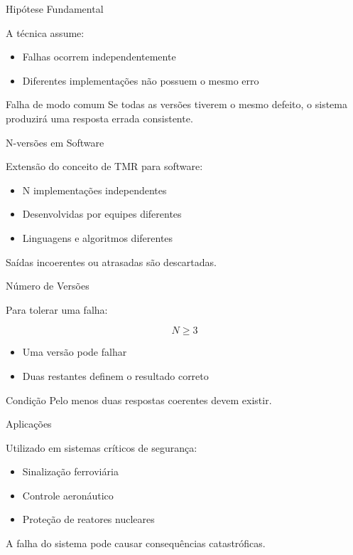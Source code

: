 \documentclass[9pt]{beamer}
\begin{document}
\begin{frame}{Hipótese Fundamental}
\small

A técnica assume:

\begin{itemize}
    \item Falhas ocorrem independentemente
    \item Diferentes implementações não possuem o mesmo erro
\end{itemize}

\begin{alertblock}{Falha de modo comum}
Se todas as versões tiverem o mesmo defeito,
o sistema produzirá uma resposta errada consistente.
\end{alertblock}

\end{frame}
\begin{frame}{N-versões em Software}
\small

Extensão do conceito de TMR para software:

\begin{itemize}
    \item N implementações independentes
    \item Desenvolvidas por equipes diferentes
    \item Linguagens e algoritmos diferentes
\end{itemize}

Saídas incoerentes ou atrasadas são descartadas.

\end{frame}
\begin{frame}{Número de Versões}
\small

Para tolerar uma falha:

\[
N \ge 3
\]

\begin{itemize}
    \item Uma versão pode falhar
    \item Duas restantes definem o resultado correto
\end{itemize}

\begin{block}{Condição}
Pelo menos duas respostas coerentes devem existir.
\end{block}

\end{frame}
\begin{frame}{Aplicações}
\small

Utilizado em sistemas críticos de segurança:

\begin{itemize}
    \item Sinalização ferroviária
    \item Controle aeronáutico
    \item Proteção de reatores nucleares
\end{itemize}

A falha do sistema pode causar consequências catastróficas.

\end{frame}
\end{document}
